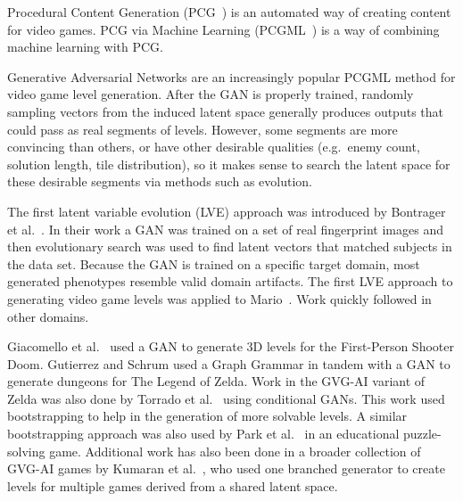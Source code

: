 Procedural Content Generation (PCG~\cite{togelius2011procedural}) is an automated way of creating content for video games. PCG via Machine Learning (PCGML~\cite{Liu_2020}) is a way of combining machine learning with PCG.

Generative Adversarial Networks are an increasingly popular PCGML method for video game level generation. After the GAN is properly trained, randomly sampling vectors from the induced latent space generally produces outputs that could pass as real segments of levels. However, some segments are more convincing than others, or have other desirable qualities (e.g.\ enemy count, solution length, tile distribution), so it makes sense to search the latent space for these desirable segments via methods such as evolution.


The first latent variable evolution (LVE) approach was introduced by Bontrager et al.~\cite{bontrager2017deepmasterprint}. In their work a GAN was trained on a set of real fingerprint images and then evolutionary search was used to find latent vectors that matched subjects in the data set. 
Because the GAN is trained on a specific target domain, most generated phenotypes resemble valid domain artifacts.
The first LVE approach to generating video game levels was applied to Mario~\cite{volz:gecco2018}. Work quickly followed in other domains.


Giacomello et al.~\cite{giacomello:cog19} used a GAN to generate 3D levels for the First-Person Shooter Doom. 
Gutierrez and Schrum \cite{gutierrez2020zeldagan} used a Graph Grammar in tandem with a GAN to generate dungeons for The Legend of Zelda. Work in the GVG-AI \cite{GVGAI:TCIAIG2016} variant of Zelda was also done by Torrado et al.~\cite{torrado:cog20} using conditional GANs. This work used bootstrapping to help in the generation of more solvable levels. A similar bootstrapping approach was also used by Park et al.~\cite{park:cog19} in an educational puzzle-solving game.
Additional work has also been done in a broader collection of GVG-AI games by Kumaran et al.~\cite{kumaran:aiide2020}, who used one branched generator to create levels for multiple games derived from a shared latent space.

